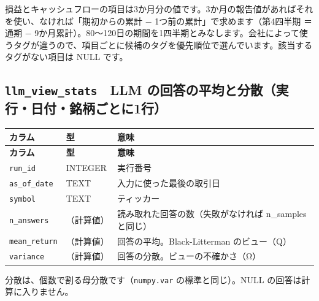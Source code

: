 \documentclass[xelatex,ja=standard,jafont=hiragino-pron,a4paper,10pt]{bxjsreport}
\begin{document}
{\small 損益とキャッシュフローの項目は3か月分の値です。3か月の報告値があればそれを使い、なければ「期初からの累計 − 1つ前の累計」で求めます（第4四半期 ＝ 通期 − 9か月累計）。80〜120日の期間を1四半期とみなします。会社によって使うタグが違うので、項目ごとに候補のタグを優先順位で選んでいます。該当するタグがない項目は NULL です。\par}
\medskip
\subsection*{\texttt{llm\_\allowbreak{}view\_\allowbreak{}stats}　LLM の回答の平均と分散（実行・日付・銘柄ごとに1行）}
{\footnotesize
\begin{longtable}{p{3.60cm}p{1.80cm}p{8.90cm}}
\toprule
\textbf{カラム} & \textbf{型} & \textbf{意味} \\
\midrule
\endfirsthead
\toprule
\textbf{カラム} & \textbf{型} & \textbf{意味} \\
\midrule
\endhead
\bottomrule
\endfoot
\texttt{run\_\allowbreak{}id} & INTEGER & 実行番号 \\
\texttt{as\_\allowbreak{}of\_\allowbreak{}date} & TEXT & 入力に使った最後の取引日 \\
\texttt{symbol} & TEXT & ティッカー \\
\texttt{n\_\allowbreak{}answers} & （計算値） & 読み取れた回答の数（失敗がなければ n\_samples と同じ） \\
\texttt{mean\_\allowbreak{}return} & （計算値） & 回答の平均。Black-Litterman のビュー（Q） \\
\texttt{variance} & （計算値） & 回答の分散。ビューの不確かさ（Ω） \\
\end{longtable}
}
{\small 分散は、個数で割る母分散です（\texttt{numpy.var} の標準と同じ）。NULL の回答は計算に入りません。\par}
\medskip
\end{document}
